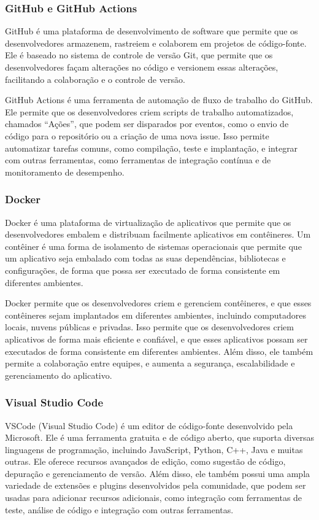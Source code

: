 \subsubsection{GitHub e GitHub Actions}

GitHub é uma plataforma de desenvolvimento de software que permite que os desenvolvedores armazenem, rastreiem e colaborem em projetos de código-fonte. Ele é baseado no sistema de controle de versão Git, que permite que os desenvolvedores façam alterações no código e versionem essas alterações, facilitando a colaboração e o controle de versão.

GitHub Actions é uma ferramenta de automação de fluxo de trabalho do GitHub. Ele permite que os desenvolvedores criem scripts de trabalho automatizados, chamados ``Ações'', que podem ser disparados por eventos, como o envio de código para o repositório ou a criação de uma nova issue. Isso permite automatizar tarefas comuns, como compilação, teste e implantação, e integrar com outras ferramentas, como ferramentas de integração contínua e de monitoramento de desempenho.

\subsubsection{Docker}

Docker é uma plataforma de virtualização de aplicativos que permite que os desenvolvedores embalem e distribuam facilmente aplicativos em contêineres. Um contêiner é uma forma de isolamento de sistemas operacionais que permite que um aplicativo seja embalado com todas as suas dependências, bibliotecas e configurações, de forma que possa ser executado de forma consistente em diferentes ambientes.

Docker permite que os desenvolvedores criem e gerenciem contêineres, e que esses contêineres sejam implantados em diferentes ambientes, incluindo computadores locais, nuvens públicas e privadas. Isso permite que os desenvolvedores criem aplicativos de forma mais eficiente e confiável, e que esses aplicativos possam ser executados de forma consistente em diferentes ambientes. Além disso, ele também permite a colaboração entre equipes, e aumenta a segurança, escalabilidade e gerenciamento do aplicativo.

\subsubsection{Visual Studio Code}

VSCode (Visual Studio Code) é um editor de código-fonte desenvolvido pela Microsoft. Ele é uma ferramenta gratuita e de código aberto, que suporta diversas linguagens de programação, incluindo JavaScript, Python, C++, Java e muitas outras. Ele oferece recursos avançados de edição, como sugestão de código, depuração e gerenciamento de versão. Além disso, ele também possui uma ampla variedade de extensões e plugins desenvolvidos pela comunidade, que podem ser usadas para adicionar recursos adicionais, como integração com ferramentas de teste, análise de código e integração com outras ferramentas.

